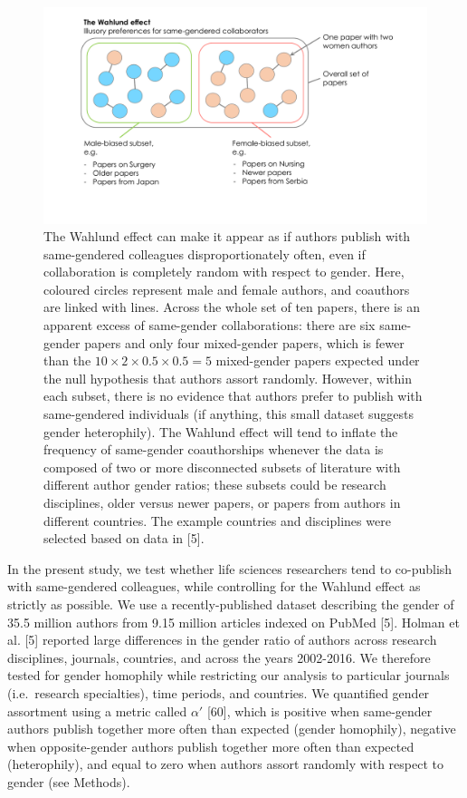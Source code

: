 \documentclass[12pt,]{article}
\begin{document}
\begin{figure}
\centering
\includegraphics{../figures/Fig1.pdf}
\caption{The Wahlund effect can make it appear as if authors publish
with same-gendered colleagues disproportionately often, even if
collaboration is completely random with respect to gender. Here,
coloured circles represent male and female authors, and coauthors are
linked with lines. Across the whole set of ten papers, there is an
apparent excess of same-gender collaborations: there are six same-gender
papers and only four mixed-gender papers, which is fewer than the
\(10\times2\times0.5\times0.5 = 5\) mixed-gender papers expected under
the null hypothesis that authors assort randomly. However, within each
subset, there is no evidence that authors prefer to publish with
same-gendered individuals (if anything, this small dataset suggests
gender heterophily). The Wahlund effect will tend to inflate the
frequency of same-gender coauthorships whenever the data is composed of
two or more disconnected subsets of literature with different author
gender ratios; these subsets could be research disciplines, older versus
newer papers, or papers from authors in different countries. The example
countries and disciplines were selected based on data in {[}5{]}.
\label{wahlund_plot}}
\end{figure}

In the present study, we test whether life sciences researchers tend to
co-publish with same-gendered colleagues, while controlling for the
Wahlund effect as strictly as possible. We use a recently-published
dataset describing the gender of 35.5 million authors from 9.15 million
articles indexed on PubMed {[}5{]}. Holman et al. {[}5{]} reported large
differences in the gender ratio of authors across research disciplines,
journals, countries, and across the years 2002-2016. We therefore tested
for gender homophily while restricting our analysis to particular
journals (i.e.~research specialties), time periods, and countries. We
quantified gender assortment using a metric called \(\alpha'\) {[}60{]},
which is positive when same-gender authors publish together more often
than expected (gender homophily), negative when opposite-gender authors
publish together more often than expected (heterophily), and equal to
zero when authors assort randomly with respect to gender (see Methods).
\end{document}
